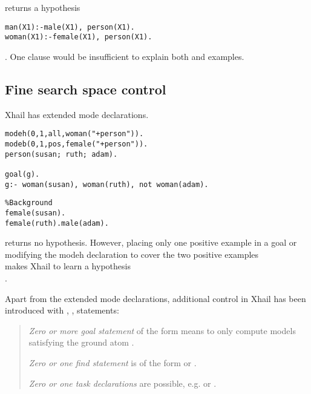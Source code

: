 returns a hypothesis
\begin{lstlisting}
man(X1):-male(X1), person(X1).
woman(X1):-female(X1), person(X1).
\end{lstlisting}.
One clause would be insufficient to explain both  and  examples.

\subsection{Fine search space control}\label{xhail_fine_search_space_control}
Xhail has extended mode declarations.

\begin{minipage}[t]{.50\textwidth}
\begin{lstlisting}
modeh(0,1,all,woman("+person")).
modeb(0,1,pos,female("+person")).
person(susan; ruth; adam).

goal(g).
g:- woman(susan), woman(ruth), not woman(adam).
\end{lstlisting}
\end{minipage}
\begin{minipage}[t]{.20\textwidth}
\begin{lstlisting}
%Background
female(susan).
female(ruth).male(adam).
\end{lstlisting}
\end{minipage}

returns no hypothesis. However, placing only one positive example in a goal
 or modifying the modeh declaration to cover the two positive examples\\
 makes Xhail to learn a hypothesis\\
.

Apart from the extended mode declarations, additional control in Xhail has been introduced with , ,  statements:

\begin{quote}\cite{ray2007xhail}
\emph{Zero or more goal statement} of the form  means to only compute models satisfying the ground atom .

\emph{Zero or one find statement} is of the form  or .

\emph{Zero or one task declarations} are possible, e.g.  or .
\end{quote}

